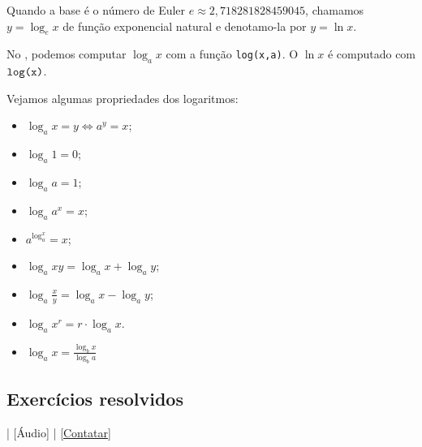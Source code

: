 \begin{obs}
  Quando a base é o número de Euler $e \approx 2,718281828459045$, chamamos $y = \log_e x$ de função exponencial natural e denotamo-la por $y = \ln x$.

  \ifispython
  No \sympy, podemos computar $\log_a x$ com a função \verb+log(x,a)+. O $\ln x$ é computado com $\verb+log(x)+$.
  \fi
\end{obs}

\begin{obs}
  Vejamos algumas propriedades dos logaritmos:
  \begin{itemize}
  \item $\displaystyle \log_a x = y \Leftrightarrow a^y = x$;
  \item $\displaystyle \log_a 1 = 0$;
  \item $\displaystyle \log_a a = 1$;
  \item $\displaystyle \log_a a^x = x$;
  \item $\displaystyle a^{\log_a^x} = x$;
  \item $\displaystyle \log_a xy = \log_a x + \log_a y$;
  \item $\displaystyle \log_a \frac{x}{y} = \log_a x - \log_a y$;
  \item $\displaystyle \log_a x^r = r\cdot\log_a x$.
  \item $\displaystyle \log_a x = \frac{\log_b x}{\log_b a}$
  \end{itemize}
\end{obs}

\subsection*{Exercícios resolvidos}

\begin{flushright}
  [Vídeo] | [Áudio] | \href{https://phkonzen.github.io/notas/contato.html}{[Contatar]}
\end{flushright}

